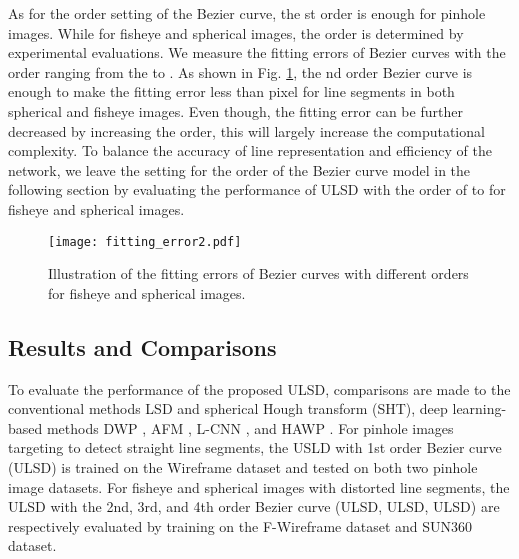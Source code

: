\documentclass[letterpaper, 10 pt, conference]{ieeeconf}
\begin{document}
As for the order setting of the Bezier curve, the st order is enough for pinhole images. While for fisheye and spherical images, the order is determined by experimental evaluations. We measure the fitting errors of Bezier curves with the order ranging from the  to . As shown in Fig. \ref{fig:4}, the nd order Bezier curve is enough to make the fitting error less than  pixel for line segments in both spherical and fisheye images. Even though, the fitting error can be further decreased by increasing the order, this will largely increase the computational complexity. To balance the accuracy of line representation and efficiency of the network, we leave the setting for the order of the Bezier curve model in the following section by evaluating the performance of ULSD with the order of  to  for fisheye and spherical images.

\begin{figure}[t]
	\begin{center}
		\texttt{[image: fitting\_error2.pdf]}
	\end{center}
	\caption{Illustration of the fitting errors of Bezier curves with different orders for fisheye and spherical images.}
	\label{fig:4}
\end{figure}

\subsection{Results and Comparisons} \label{sec4-3} 
To evaluate the performance of the proposed ULSD, comparisons are made to the conventional methods LSD \cite{LSD} and spherical Hough transform (SHT), deep learning-based methods DWP \cite{DWP}, AFM \cite{AFM}, L-CNN \cite{LCNN}, and HAWP \cite{HAWP}. For pinhole images targeting to detect straight line segments, the USLD with 1st order Bezier curve (ULSD) is trained on the Wireframe dataset and tested on both two pinhole image datasets. For fisheye and spherical images with distorted line segments, the ULSD with the 2nd, 3rd, and 4th order Bezier curve (ULSD, ULSD, ULSD) are respectively evaluated by training on the F-Wireframe dataset and SUN360 dataset.
\end{document}
